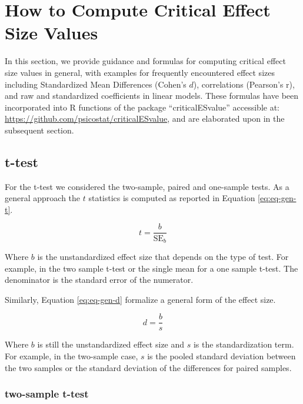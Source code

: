 \documentclass[
  man]{apa7}
\begin{document}
\hypertarget{how-to-compute-critical-effect-size-values}{%
\section{How to Compute Critical Effect Size Values}\label{how-to-compute-critical-effect-size-values}}

In this section, we provide guidance and formulas for computing critical effect size values in general, with examples for frequently encountered effect sizes including Standardized Mean Differences (Cohen's \(d\)), correlations (Pearson's r), and raw and standardized coefficients in linear models. These formulas have been incorporated into R functions of the package ``criticalESvalue'' accessible at: \url{https://github.com/psicostat/criticalESvalue}, and are elaborated upon in the subsequent section.

\hypertarget{t-test}{%
\subsection{t-test}\label{t-test}}

For the t-test we considered the two-sample, paired and one-sample tests. As a general approach the \(t\) statistics is computed as reported in Equation \eqref{eq:eq-gen-t}.

\begin{equation}
    \label{eq:eq-gen-t}
    t = \frac{b}{\text{SE}_{b}}
\end{equation}

Where \(b\) is the unstandardized effect size that depends on the type of test. For example, in the two sample t-test or the single mean for a one sample t-test. The denominator is the standard error of the numerator.

Similarly, Equation \eqref{eq:eq-gen-d} formalize a general form of the effect size.

\begin{equation}
    \label{eq:eq-gen-d}
    d = \frac{b}{s}
\end{equation}

Where \(b\) is still the unstandardized effect size and \(s\) is the standardization term. For example, in the two-sample case, \(s\) is the pooled standard deviation between the two samples or the standard deviation of the differences for paired samples.

\hypertarget{two-sample-t-test}{%
\subsubsection{two-sample t-test}\label{two-sample-t-test}}
\end{document}
